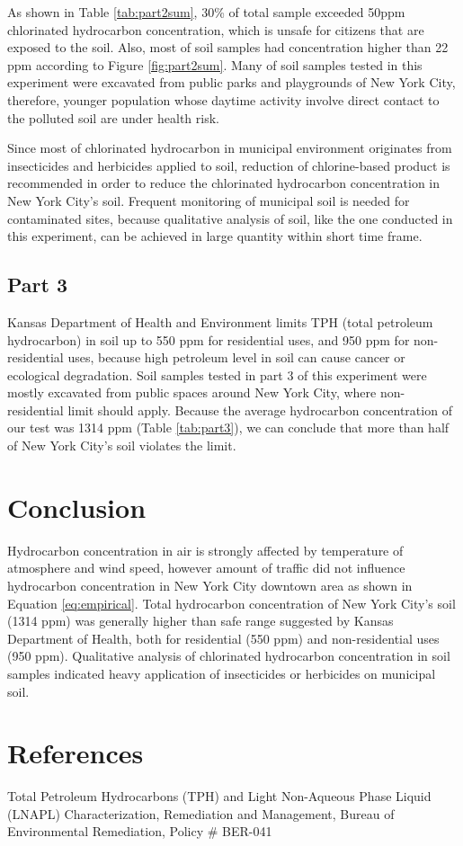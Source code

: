\documentclass{article}
\begin{document}
As shown in Table \ref{tab:part2sum}, 30\% of total sample exceeded 50ppm chlorinated hydrocarbon concentration, which is unsafe for citizens that are exposed to the soil. Also, most of soil samples had concentration higher than 22 ppm according to Figure \ref{fig:part2sum}. Many of soil samples tested in this experiment were excavated from public parks and playgrounds of New York City, therefore, younger population whose daytime activity involve direct contact to the polluted soil are under health risk.

Since most of chlorinated hydrocarbon in municipal environment originates from insecticides and herbicides applied to soil, reduction of chlorine-based product is recommended in order to reduce the chlorinated hydrocarbon concentration in New York City's soil. Frequent monitoring of municipal soil is needed for contaminated sites, because qualitative analysis of soil, like the one conducted in this experiment, can be achieved in large quantity within short time frame.

\subsection{Part 3}

Kansas Department of Health and Environment limits TPH (total petroleum hydrocarbon) in soil up to 550 ppm for residential uses, and 950 ppm for non-residential uses, because high petroleum level in soil can cause cancer or ecological degradation. Soil samples tested in part 3 of this experiment were mostly excavated from public spaces around New York City, where non-residential limit should apply. Because the average hydrocarbon concentration of our test was 1314 ppm (Table \ref{tab:part3}), we can conclude that more than half of New York City's soil violates the limit.

\section{Conclusion}\label{sec:conclusion}

Hydrocarbon concentration in air is strongly affected by temperature of atmosphere and wind speed, however amount of traffic did not influence hydrocarbon concentration in New York City downtown area as shown in Equation \ref{eq:empirical}. Total hydrocarbon concentration of New York City's soil (1314 ppm) was generally higher than safe range suggested by Kansas Department of Health, both for residential (550 ppm) and non-residential uses (950 ppm). Qualitative analysis of chlorinated hydrocarbon concentration in soil samples indicated heavy application of insecticides or herbicides on municipal soil.

\newpage

\section{References}\label{sec:ref}

Total Petroleum Hydrocarbons (TPH) and Light Non-Aqueous Phase Liquid (LNAPL) Characterization, Remediation and Management, Bureau of Environmental Remediation, Policy \# BER-041
\end{document}
